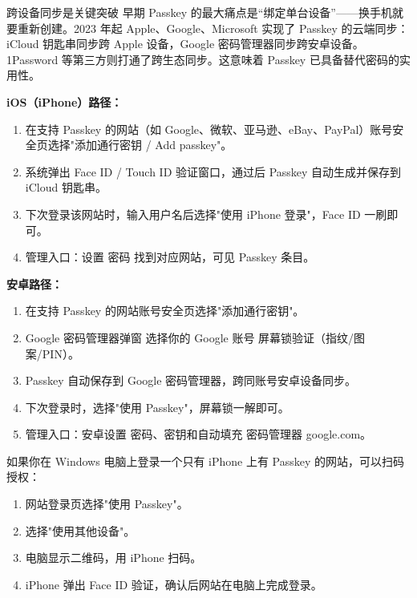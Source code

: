 \begin{tcbinfo}{跨设备同步是关键突破}
早期 Passkey 的最大痛点是“绑定单台设备”——换手机就要重新创建。2023 年起 Apple、Google、Microsoft 实现了 Passkey 的云端同步：iCloud 钥匙串同步跨 Apple 设备，Google 密码管理器同步跨安卓设备。1Password 等第三方则打通了跨生态同步。这意味着 Passkey 已具备替代密码的实用性。

\end{tcbinfo}


\textbf{iOS（iPhone）路径：}

\begin{enumerate}
  \item 在支持 Passkey 的网站（如 Google、微软、亚马逊、eBay、PayPal）账号安全页选择"添加通行密钥 / Add passkey"。
  \item 系统弹出 Face ID / Touch ID 验证窗口，通过后 Passkey 自动生成并保存到 iCloud 钥匙串。
  \item 下次登录该网站时，输入用户名后选择"使用 iPhone 登录"，Face ID 一刷即可。
  \item 管理入口：设置 密码 找到对应网站，可见 Passkey 条目。
\end{enumerate}

\textbf{安卓路径：}

\begin{enumerate}
  \item 在支持 Passkey 的网站账号安全页选择"添加通行密钥"。
  \item Google 密码管理器弹窗 选择你的 Google 账号 屏幕锁验证（指纹/图案/PIN）。
  \item Passkey 自动保存到 Google 密码管理器，跨同账号安卓设备同步。
  \item 下次登录时，选择"使用 Passkey"，屏幕锁一解即可。
  \item 管理入口：安卓设置 密码、密钥和自动填充 密码管理器 google.com。
\end{enumerate}


如果你在 Windows 电脑上登录一个只有 iPhone 上有 Passkey 的网站，可以扫码授权：

\begin{enumerate}
  \item 网站登录页选择"使用 Passkey"。
  \item 选择"使用其他设备"。
  \item 电脑显示二维码，用 iPhone 扫码。
  \item iPhone 弹出 Face ID 验证，确认后网站在电脑上完成登录。
\end{enumerate}

